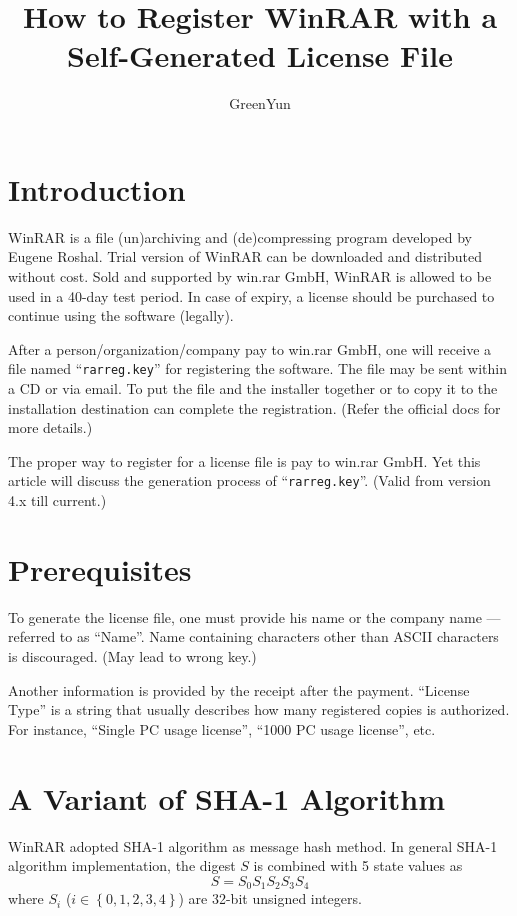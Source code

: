 \documentclass[oneside]{article}
\begin{document}
\title{How to Register WinRAR with a Self-Generated License File}
\author{GreenYun}
\maketitle

\section{Introduction}
WinRAR is a file (un)archiving and (de)compressing program developed by Eugene Roshal.
Trial version of WinRAR can be downloaded and distributed without cost.
Sold and supported by win.rar GmbH, WinRAR is allowed to be used in a 40-day test period.
In case of expiry, a license should be purchased to continue using the software (legally).

After a person/organization/company pay to win.rar GmbH, one will receive a file named ``\texttt{rarreg.key}'' for registering the software.
The file may be sent within a CD or via email.
To put the file and the installer together or to copy it to the installation destination can complete the registration.
(Refer the official docs for more details.)

The proper way to register for a license file is pay to win.rar GmbH.
Yet this article will discuss the generation process of ``\texttt{rarreg.key}''. (Valid from version 4.x till current.)

\section{Prerequisites}
To generate the license file, one must provide his name or the company name --- referred to as ``Name''.
Name containing characters other than ASCII characters is discouraged. (May lead to wrong key.)

Another information is provided by the receipt after the payment.
``License Type'' is a string that usually describes how many registered copies is authorized.
For instance, ``Single PC usage license'', ``1000 PC usage license'', etc.

\section{A Variant of SHA-1 Algorithm}\label{SHA-1}
WinRAR adopted SHA-1 algorithm as message hash method.
In general SHA-1 algorithm implementation, the digest $S$ is combined with 5 state values as
\[S=S_0S_1S_2S_3S_4\]
where $S_i$ ($i\in\left\{0,1,2,3,4\right\}$) are 32-bit unsigned integers.
\end{document}
